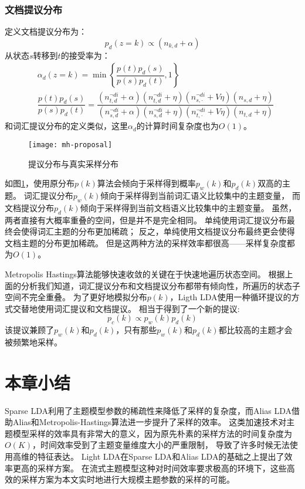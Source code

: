 \subsubsection{文档提议分布}
定义文档提议分布为：
\begin{equation}
p_d(z = k) \propto (n_{k,d} +\alpha)
\end{equation}
从状态$s$转移到$t$的接受率为：
\begin{equation}
\begin{aligned}
& \alpha_d(z=k) = \min \left\{\dfrac{p(t) p_d(s)}{p(s)p_d(t)}, 1\right\} \\
& \dfrac{p(t) p_d(s)}{p(s)p_d(t)}=
\dfrac{ (n_{t,d}^{\neg di} + \alpha)(n_{t,d}^{\neg di} + \eta) (n_{s,\cdot}^{\neg di} + V \eta) (n_{s,d} + \eta) }
{ (n_{s,d}^{\neg di} + \alpha)(n_{s,d}^{\neg di} + \eta) (n_{t,\cdot}^{\neg di} + V \eta) (n_{t,d} + \eta) }
\end{aligned}
\end{equation}
和词汇提议分布的定义类似，这里$\alpha_d$的计算时间复杂度也为$O(1)$。

\begin{figure}[htb]\centering
\texttt{[image: mh-proposal]}
\caption{提议分布与真实采样分布}
\label{fig:mh-proposal}       %
\end{figure}

如图\ref{fig:mh-proposal}，使用原分布$p(k)$算法会倾向于采样得到概率$p_w(k)$和$p_d(k)$双高的主题。
词汇提议分布$p_w(k)$倾向于采样得到当前词汇语义比较集中的主题变量，
而文档提议分布$p_d(k)$倾向于采样得到当前文档语义比较集中的主题变量。
虽然，两者直接有大概率重叠的空间，但是并不是完全相同。
单纯使用词汇提议分布最终会使得词汇主题的分布更加稀疏；
反之，单纯使用文档提议分布最终更会使得文档主题的分布更加稀疏。
但是这两种方法的采样效率都很高——采样复杂度都为$O(1)$。

Metropolis Hastings算法能够快速收敛的关键在于快速地遍历状态空间。
根据上面的分析我们知道，词汇提议分布和文档提议分布都带有倾向性，所遍历的状态子空间不完全重叠。
为了更好地模拟分布$p(k)$，Ligth LDA使用一种循环提议的方式交替地使用词汇提议和文档提议。
相当于得到了一个新的提议:
\begin{equation}
p_c(k) \propto p_w(k) p_d(k)
\end{equation}
该提议兼顾了$p_w(k)$和$p_d(k)$，只有那些$p_w(k)$和$p_d(k)$都比较高的主题才会被频繁地采样。

\section{本章小结}
Sparse LDA利用了主题模型参数的稀疏性来降低了采样的复杂度，而Alias LDA借助Alias和Metropolis-Hastings算法进一步提升了采样的效率。
这类加速技术对主题模型采样的效率具有非常大的意义，因为原先朴素的采样方法的时间复杂度为$O(K)$，时间效率受到了主题变量维度大小的严重限制，
导致了许多时候无法使用高维的特征表达。
Light LDA在Sparse LDA和Alias LDA的基础之上提出了效率更高的采样方案。
在流式主题模型这种对时间效率要求极高的环境下，这些高效的采样方案为本文实时地进行大规模主题参数的采样的可能。

